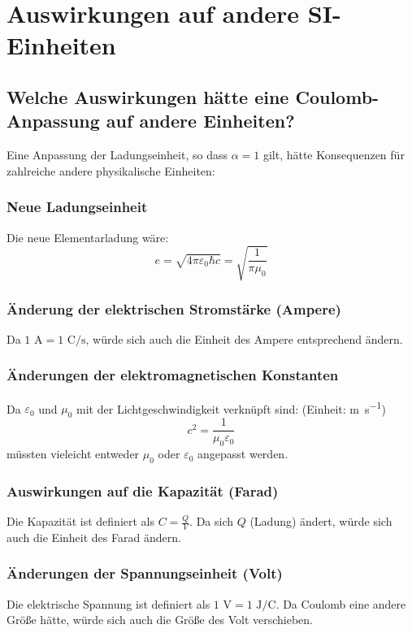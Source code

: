 \documentclass{article}
\begin{document}
	\section{Auswirkungen auf andere SI-Einheiten}
	
	\subsection{ Welche Auswirkungen hätte eine Coulomb-Anpassung auf andere Einheiten?}
	
	Eine Anpassung der Ladungseinheit, so dass $\alpha = 1$ gilt, hätte Konsequenzen für zahlreiche andere physikalische Einheiten:
	
	\subsubsection{Neue Ladungseinheit}
	Die neue Elementarladung wäre:
	$$e = \sqrt{4\pi\varepsilon_0\hbar c} = \sqrt{\frac{1}{\pi \mu_0}}$$
	
	\subsubsection{Änderung der elektrischen Stromstärke (Ampere)}
	Da $1 \text{ A} = 1 \text{ C}/\text{s}$, würde sich auch die Einheit des Ampere entsprechend ändern.
	
	\subsubsection{Änderungen der elektromagnetischen Konstanten}
	Da $\varepsilon_0$ und $\mu_0$ mit der Lichtgeschwindigkeit verknüpft sind:
 (Einheit: \si{\meter\per\second})	$$c^2 = \frac{1}{\mu_0\varepsilon_0}$$
	müssten vieleicht entweder $\mu_0$ oder $\varepsilon_0$ angepasst werden.
	
	\subsubsection{Auswirkungen auf die Kapazität (Farad)}
	Die Kapazität ist definiert als $C = \frac{Q}{V}$. Da sich $Q$ (Ladung) ändert, würde sich auch die Einheit des Farad ändern.
	
	\subsubsection{Änderungen der Spannungseinheit (Volt)}
	Die elektrische Spannung ist definiert als $1 \text{ V} = 1 \text{ J}/\text{C}$. Da Coulomb eine andere Größe hätte, würde sich auch die Größe des Volt verschieben.
	
\end{document}
